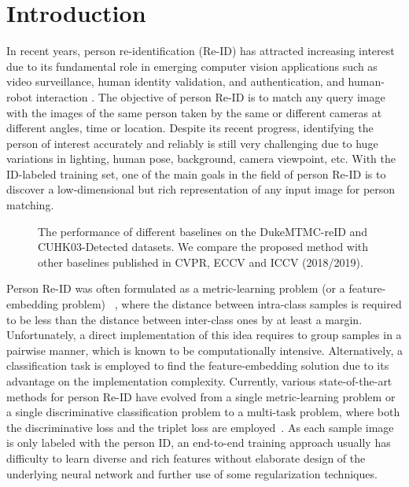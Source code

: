 \documentclass[journal]{IEEEtran}
\begin{document}
\IEEEpeerreviewmaketitle

\newtheorem{plm}{Problem}
\newtheorem{thm}{Theorem}
\section{Introduction}
In recent years, person re-identification (Re-ID) has attracted increasing interest due to its fundamental role in emerging computer vision applications such as video surveillance, human identity validation, and authentication, and human-robot interaction \cite{zheng2016person,dai2019BDB,chen2019MHN,yang2019CAMA,hou2019IAN,chen2019ABD}. The objective of person Re-ID is to match any query image with the images of the same person taken by the same or different cameras at different angles, time or location. Despite its recent progress, identifying the person of interest accurately and reliably is still very challenging due to  huge variations in lighting, human pose, background, camera viewpoint, etc. With the ID-labeled training set, one of the main goals in the field of person Re-ID is to discover a low-dimensional but rich representation of any input image for person matching.
\begin{figure}[t]
\centering
{}
\caption{The performance of different baselines on the DukeMTMC-reID and CUHK03-Detected datasets. We compare the proposed method with other baselines published in CVPR, ECCV and ICCV (2018/2019).}
\label{fig:dem}
\end{figure}



Person Re-ID was often formulated as a metric-learning problem (or a feature-embedding problem) ~\cite{su2017pose,chen2017beyond,bai2017reid}, where the distance between intra-class samples is required to be less than the distance between inter-class ones by at least a margin. Unfortunately, a direct implementation of this idea requires to group samples in a pairwise manner, which is known to be computationally intensive. Alternatively, a classification task is employed to find the feature-embedding solution due to its advantage on the implementation complexity. Currently, various state-of-the-art methods \cite{he2019Bag,dai2019BDB,chen2019ABD,zheng2017discriminatively,hermans2017defense} for person Re-ID have evolved from a single metric-learning problem or a single discriminative classification problem to a multi-task problem, where both the discriminative loss and the triplet loss are employed~\cite{su2016deep}. As each sample image is only labeled with the person ID, an end-to-end training approach usually has difficulty to learn diverse and rich features without elaborate design of the underlying neural network and further use of some regularization techniques.
\end{document}
